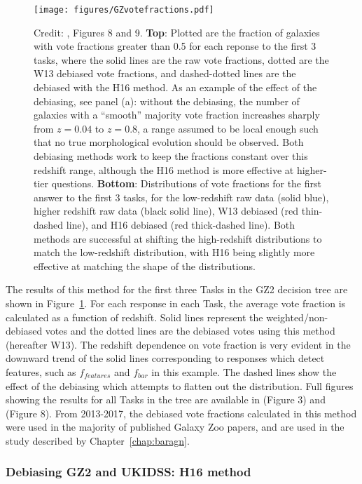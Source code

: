 \begin{figure}
\centering
\texttt{[image: figures/GZvotefractions.pdf]}
\caption{Credit: \citet{Hart2016}, Figures 8 and 9. \textbf{Top}: Plotted are the fraction of galaxies with vote fractions greater than 0.5 for each reponse to the first 3 tasks, where the solid lines are the raw vote fractions, dotted are the W13 debiased vote fractions, and dashed-dotted lines are the debiased with the H16 method. As an example of the effect of the debiasing, see panel (a): without the debiasing, the number of galaxies with a ``smooth'' majority vote fraction increashes sharply from $z=0.04$ to $z=0.8$, a range assumed to be local enough such that no true morphological evolution should be observed. Both debiasing methods work to keep the fractions constant over this redshift range, although the H16 method is more effective at higher-tier questions. \textbf{Bottom}: Distributions of vote fractions for the first answer to the first 3 tasks, for the low-redshift raw data (solid blue), higher redshift raw data (black solid line), W13 debiased (red thin-dashed line), and H16 debiased (red thick-dashed line). Both methods are successful at shifting the high-redshift distributions to match the low-redshift distribution, with H16 being slightly more effective at matching the shape of the distributions.}
\label{fig:gz2debiasingresults}
\end{figure}

The results of this method for the first three Tasks in the GZ2 decision tree are shown in Figure~\ref{fig:gz2debiasingresults}. For each response in each Task, the average vote fraction is calculated as a function of redshift. Solid lines represent the weighted/non-debiased votes and the dotted lines are the debiased votes using this method (hereafter W13).
The redshift dependence on vote fraction is very evident in the downward trend of the solid lines corresponding to responses which detect features, such as $f_{features}$ and $f_{bar}$ in this example. The dashed lines show the effect of the debiasing which attempts to flatten out the distribution. Full figures showing the results for all Tasks in the tree are available in \citet{Willett2013} (Figure 3) and \citet{Hart2016} (Figure 8). From 2013-2017, the debiased vote fractions calculated in this method were used in the majority of published Galaxy Zoo papers, and are used in the study described by Chapter~\ref{chap:baragn}. 


\subsubsection{Debiasing GZ2 and UKIDSS: H16 method}

